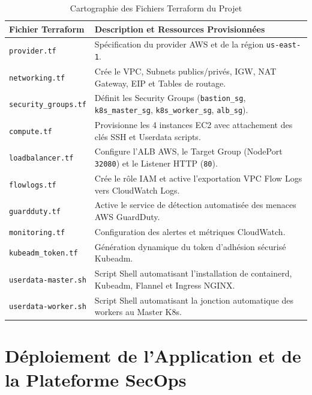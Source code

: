 \documentclass[12pt,a4paper]{report}
\begin{document}
\begin{table}[H]
\centering
\caption{Cartographie des Fichiers Terraform du Projet}
\label{tab:terraform}
\begin{tabularx}{\textwidth}{lX}
\toprule
\textbf{Fichier Terraform} & \textbf{Description et Ressources Provisionnées} \\
\midrule
\texttt{provider.tf} & Spécification du provider AWS et de la région \texttt{us-east-1}. \\
\texttt{networking.tf} & Crée le VPC, Subnets publics/privés, IGW, NAT Gateway, EIP et Tables de routage. \\
\texttt{security\_groups.tf} & Définit les Security Groups (\texttt{bastion\_sg}, \texttt{k8s\_master\_sg}, \texttt{k8s\_worker\_sg}, \texttt{alb\_sg}). \\
\texttt{compute.tf} & Provisionne les 4 instances EC2 avec attachement des clés SSH et Userdata scripts. \\
\texttt{loadbalancer.tf} & Configure l'ALB AWS, le Target Group (NodePort \texttt{32080}) et le Listener HTTP (\texttt{80}). \\
\texttt{flowlogs.tf} & Crée le rôle IAM et active l'exportation VPC Flow Logs vers CloudWatch Logs. \\
\texttt{guardduty.tf} & Active le service de détection automatisée des menaces AWS GuardDuty. \\
\texttt{monitoring.tf} & Configuration des alertes et métriques CloudWatch. \\
\texttt{kubeadm\_token.tf} & Génération dynamique du token d'adhésion sécurisé Kubeadm. \\
\texttt{userdata-master.sh} & Script Shell automatisant l'installation de containerd, Kubeadm, Flannel et Ingress NGINX. \\
\texttt{userdata-worker.sh} & Script Shell automatisant la jonction automatique des workers au Master K8s. \\
\bottomrule
\end{tabularx}
\end{table}

\chapter{Déploiement de l'Application et de la Plateforme SecOps}
\end{document}
